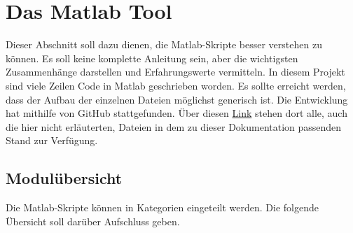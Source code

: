 \newpage
\section{Das Matlab Tool}

Dieser Abschnitt soll dazu dienen, die Matlab-Skripte besser verstehen zu können. Es soll keine komplette Anleitung sein, aber die wichtigsten Zusammenhänge darstellen und Erfahrungswerte vermitteln. In diesem Projekt sind viele Zeilen Code in Matlab geschrieben worden. Es sollte erreicht werden, dass der Aufbau der einzelnen Dateien möglichst generisch ist. Die Entwicklung hat mithilfe von GitHub stattgefunden. Über diesen \href{https://github.com/TonightsCoding/MachineLearning/releases/tag/v1.0.0}{Link} stehen dort alle, auch die hier nicht erläuterten, Dateien in dem zu dieser Dokumentation passenden Stand zur Verfügung.


\subsection{Modulübersicht}
Die Matlab-Skripte können in Kategorien eingeteilt werden. Die folgende Übersicht soll darüber Aufschluss geben. 


